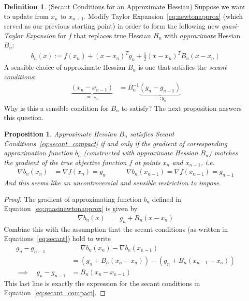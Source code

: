 \documentclass[12pt]{article}
\numberwithin{equation}{section} %
\theoremstyle{plain}
\newtheorem{prop}[thm]{Proposition}
\theoremstyle{definition}
\newtheorem{defn}[thm]{Definition}
\theoremstyle{remark}
\begin{document}
\begin{defn}(Secant Conditions for an Approximate Hessian)
Suppose we want to update from $x_n$ to $x_{n+1}$.
Modify Taylor Expansion~\ref{eq:newtonapprox} (which served as our
previous starting point) in order to form the following new
\emph{quasi-Taylor Expansion} for $f$ that replaces true Hessian $H_n$
with \emph{approximate} Hessian $B_n$:
\begin{align}
  b_n(x) := f(x_n) + (x-x_n)^Tg_n + \frac{1}{2}(x-x_n)^T B_n (x-x_n)
  \label{eq:quasinewtonapprox}
\end{align}
A sensible choice of approximate Hessian $B_n$ is one that satisfies the
\emph{secant conditions}:
\begin{align}
  \underbrace{(x_{n}-x_{n-1})}_{=:s_n}
  &=
  B_n^{-1}\underbrace{(g_{n}-g_{n-1})}_{=:y_n} \label{eq:secant_compact}
\end{align}
Why is this a sensible condition for $B_n$ to satisfy? The next
proposition answers this question.
\end{defn}

\begin{prop}
Approximate Hessian $B_n$ satisfies Secant
Conditions~\ref{eq:secant_compact} if and only if the gradient of
corresponding approximation function $b_n$ (constructed with approximate
Hessian $B_n$) \emph{matches} the gradient of the \emph{true} objective
function $f$ at points $x_n$ and $x_{n-1}$, i.e.
\begin{align}
  \nabla b_n(x_n) &= \nabla f(x_n) = g_n
  \qquad\quad
  \nabla b_n(x_{n-1}) = \nabla f(x_{n-1}) = g_{n-1}
  \label{eq:secant}
\end{align}
And this seems like an uncontroversial and sensible restriction to
impose.
\end{prop}
\begin{proof}
The gradient of approximating function $b_n$ defined in
Equation~\ref{eq:quasinewtonapprox} is given by
\begin{align*}
  \nabla b_n(x) &= g_n + B_n(x-x_n)
\end{align*}
Combine this with the assumption that the secant conditions (as written
in Equations~\ref{eq:secant}) hold to write
\begin{align*}
  g_n - g_{n-1}
  &= \nabla b_n(x_n) - \nabla b_n(x_{n-1}) \\
  &= (g_n + B_n(x_n-x_n)) - (g_n + B_n(x_{n-1}-x_n)) \\
  \implies\quad
  g_n - g_{n-1}
  &= B_n(x_{n}-x_{n-1})
\end{align*}
This last line is exactly the expression for the secant conditions in
Equation~\ref{eq:secant_compact}.
\end{proof}
\end{document}
